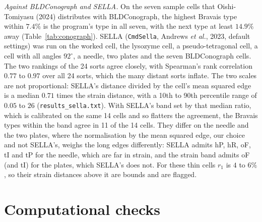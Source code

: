 \documentclass[preprint,pdf]{iucr}          %
\begin{document}
\emph{Against BLDConograph and SELLA.} On the seven sample cells that Oishi-Tomiyasu (2024) distributes with BLDConograph, the highest Bravais type within $7.4\%$ is the program's type in all seven, with the next type at least $14.9\%$ away (Table~\ref{tab:conograph}). SELLA (\texttt{CmdSella}, Andrews \emph{et al.}, 2023, default settings) was run on the worked cell, the lysozyme cell, a pseudo-tetragonal cell, a cell with all angles $92^\circ$, a needle, two plates and the seven BLDConograph cells. The two rankings of the 24 sorts agree closely, with Spearman's rank correlation $0.77$ to $0.97$ over all 24 sorts, which the many distant sorts inflate. The two scales are not proportional: SELLA's distance divided by the cell's mean squared edge is a median $0.71$ times the strain distance, with a 10th to 90th percentile range of $0.05$ to $26$ (\texttt{results\_sella.txt}). With SELLA's band set by that median ratio, which is calibrated on the same 14 cells and so flatters the agreement, the Bravais types within the band agree in 11 of the 14 cells. They differ on the needle and the two plates, where the normalisation by the mean squared edge, our choice and not SELLA's, weighs the long edges differently: SELLA admits hP, hR, oF, tI and tP for the needle, which are far in strain, and the strain band admits oF (and tI) for the plates, which SELLA's does not. For these thin cells $r_1$ is $4$ to $6\%$, so their strain distances above it are bounds and are flagged.


\section{Computational checks}
\end{document}
